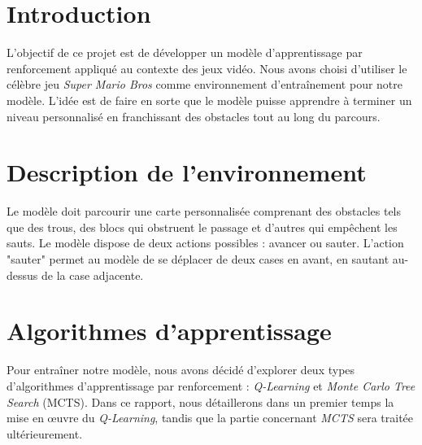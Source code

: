 \documentclass[a4paper,12pt]{article}
\begin{document}
\newpage
\maketitle
\tableofcontents

\newpage

\maketitle

\section{Introduction}
L'objectif de ce projet est de développer un modèle d'apprentissage par renforcement appliqué au contexte des jeux vidéo. Nous avons choisi d'utiliser le célèbre jeu \textit{Super Mario Bros} comme environnement d'entraînement pour notre modèle. L'idée est de faire en sorte que le modèle puisse apprendre à terminer un niveau personnalisé en franchissant des obstacles tout au long du parcours.

\section{Description de l'environnement}
Le modèle doit parcourir une carte personnalisée comprenant des obstacles tels que des trous, des blocs qui obstruent le passage et d'autres qui empêchent les sauts. Le modèle dispose de deux actions possibles : avancer ou sauter. L'action "sauter" permet au modèle de se déplacer de deux cases en avant, en sautant au-dessus de la case adjacente. 

\section{Algorithmes d'apprentissage}
Pour entraîner notre modèle, nous avons décidé d'explorer deux types d'algorithmes d'apprentissage par renforcement : \textit{Q-Learning} et \textit{Monte Carlo Tree Search} (MCTS). Dans ce rapport, nous détaillerons dans un premier temps la mise en œuvre du \textit{Q-Learning}, tandis que la partie concernant \textit{MCTS} sera traitée ultérieurement.
\end{document}
